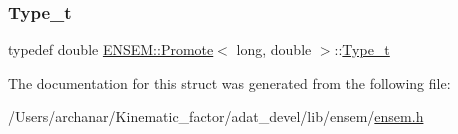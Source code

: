 \subsubsection{\texorpdfstring{Type\_t}{Type\_t}\hspace{0.1cm}{\footnotesize\ttfamily [2/2]}}
{\footnotesize\ttfamily typedef double \mbox{\hyperlink{structENSEM_1_1Promote}{E\+N\+S\+E\+M\+::\+Promote}}$<$ long, double $>$\+::\mbox{\hyperlink{structENSEM_1_1Promote_3_01long_00_01double_01_4_ab96351d39563d95f7a63ce59e9fe2e9d}{Type\+\_\+t}}}



The documentation for this struct was generated from the following file\+:\begin{DoxyCompactItemize}
\item 
/\+Users/archanar/\+Kinematic\+\_\+factor/adat\+\_\+devel/lib/ensem/\mbox{\hyperlink{lib_2ensem_2ensem_8h}{ensem.\+h}}\end{DoxyCompactItemize}
